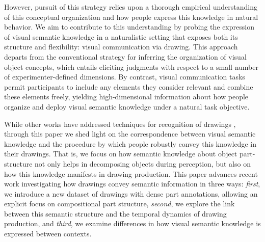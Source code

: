 \documentclass[10pt,letterpaper]{article}
\begin{document}
However, pursuit of this strategy relies upon a thorough empirical understanding of this conceptual organization and how people express this knowledge in natural behavior. 
We aim to contribute to this understanding by probing the expression of visual semantic knowledge in a naturalistic setting that exposes both its structure and flexibility: visual communication via drawing. 
This approach departs from the conventional strategy for inferring the organization of visual object concepts, which entails eliciting judgments with respect to a small number of experimenter-defined dimensions. 
By contrast, visual communication tasks permit participants to include any elements they consider relevant and combine these elements freely, yielding high-dimensional information about how people organize and deploy visual semantic knowledge under a natural task objective. 


While other works have addressed techniques for recognition of drawings \cite{ha2017neural,li2019photo}, through this paper we shed light on the correspondence between visual semantic knowledge and the procedure by which people robustly convey this knowledge in their drawings. That is, we focus on how semantic knowledge about object part-structure not only helps in decomposing objects during perception, but also on how this knowledge manifests in drawing production.
This paper advances recent work \cite{FanCommon2018} investigating how drawings convey semantic information in three ways: 
\textit{first}, we introduce a new dataset of drawings with dense part annotations, allowing an explicit focus on compositional part structure,
\textit{second}, we explore the link between this semantic structure and the temporal dynamics of drawing production,
and \textit{third}, we examine differences in how visual semantic knowledge is expressed between contexts. 

\end{document}
